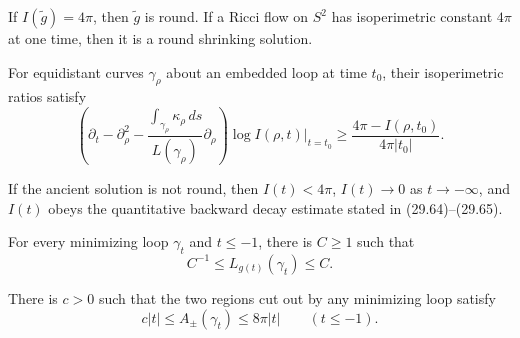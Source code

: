 \begin{lemma}
\label{lem:chow-iv-isoperimetric-rigidity}
If \(I(\widetilde g)=4\pi\), then \(\widetilde g\) is round.  If a Ricci
flow on \(S^2\) has isoperimetric constant \(4\pi\) at one time, then it is a
round shrinking solution.
\end{lemma}

\begin{lemma}
\label{lem:chow-iv-isoperimetric-ratio-evolution}
For equidistant curves \(\gamma_\rho\) about an embedded loop at time \(t_0\),
their isoperimetric ratios satisfy
\[
 \left(\partial_t-\partial_\rho^2-
 \frac{\int_{\gamma_\rho}\kappa_\rho\,ds}{L(\gamma_\rho)}\partial_\rho\right)
 \log I(\rho,t)\big|_{t=t_0}
 \ge \frac{4\pi-I(\rho,t_0)}{4\pi|t_0|}.
\]
\end{lemma}

\begin{proposition}
\label{prop:chow-iv-isoperimetric-decay}
If the ancient solution is not round, then \(I(t)<4\pi\),
\(I(t)\to0\) as \(t\to-\infty\), and \(I(t)\) obeys the quantitative
backward decay estimate stated in (29.64)--(29.65).
\end{proposition}

\begin{proposition}
\label{prop:chow-iv-isoperimetric-loop-bounds}
For every minimizing loop \(\gamma_t\) and \(t\le-1\), there is \(C\ge1\)
such that
\[
 C^{-1}\le L_{g(t)}(\gamma_t)\le C.
\]
\end{proposition}

\begin{lemma}
\label{lem:chow-iv-isoperimetric-region-areas}
There is \(c>0\) such that the two regions cut out by any minimizing loop
satisfy
\[
 c|t|\le A_\pm(\gamma_t)\le8\pi|t|\qquad(t\le-1).
\]
\end{lemma}

